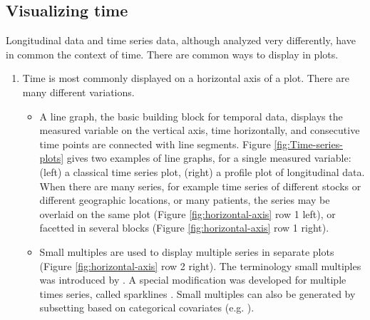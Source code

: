 \documentclass[12pt]{article}
\newcommand{\red}[1]{{\color{red} #1}}
\begin{document}
\subsection{Visualizing time}

Longitudinal data and time series data, although analyzed very differently, have in common the context of time.  There are common ways to display  in plots.

\begin{enumerate}
\item Time is most commonly displayed on a horizontal axis of a plot. There are many different variations. 

\begin{itemize}
\item A line graph, the basic building block for temporal data, displays the measured variable on the vertical axis, time horizontally, and consecutive time points are connected with line segments. Figure \ref{fig:Time-series-plots} gives two examples of line graphs, for a single measured variable: (left) a classical time series plot, (right) a profile plot of longitudinal data. When there are many series, for example time series of different stocks or different geographic locations, or many patients, the series may be overlaid on the same plot (Figure \ref{fig:horizontal-axis} row 1 left), or facetted in several blocks (Figure \ref{fig:horizontal-axis} row 1 right). 


\item Small multiples are used to display multiple series in separate plots (Figure \ref{fig:horizontal-axis} row 2 right). The terminology small multiples was introduced by \citet{tufte1983visual}. A special modification was developed for multiple times series, called sparklines \citet{tufte2006evidence}. Small multiples can also be generated by subsetting based on categorical covariates (e.g. \citet{Cleveland1993}). 


\end{itemize}
\end{enumerate}
\end{document}
